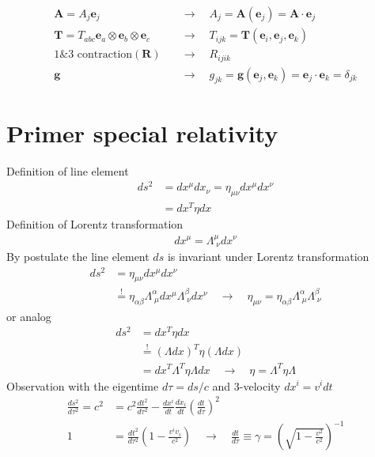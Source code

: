 \documentclass[10pt,a4paper]{article}
\theoremstyle{definition}
\begin{document}
\begin{itemize}
\begin{align}
    \mathbf{A}=A_j\mathbf{e}_j\quad&\rightarrow\quad A_j=\mathbf{A}(\mathbf{e}_j)=\mathbf{A}\cdot\mathbf{e}_j\\
    \mathbf{T}=T_{abc}\mathbf{e}_a\otimes\mathbf{e}_b\otimes\mathbf{e}_c\quad&\rightarrow\quad T_{ijk}=\mathbf{T}(\mathbf{e}_i,\mathbf{e}_j,\mathbf{e}_k)\\
    \text{1\&3 contraction}(\mathbf{R})\quad&\rightarrow\quad R_{ijik}\\
    \mathbf{g}\quad&\rightarrow\quad g_{jk}=\mathbf{g}(\mathbf{e}_j,\mathbf{e}_k)=\mathbf{e}_j\cdot\mathbf{e}_k=\delta_{jk}
\end{align}
\end{itemize}


\newpage
\section{Primer special relativity}
Definition of line element
\begin{align}
    ds^2 &= dx^\mu dx_\nu = \eta_{\mu\nu}dx^\mu dx^\nu\\
        &= dx^T\eta dx
\end{align}
Definition of Lorentz transformation
\begin{align}
    dx^\mu = \Lambda^\mu_{\;\nu}dx^\nu
\end{align}
By postulate the line element $ds$ is invariant under Lorentz transformation
\begin{align}
    ds^2 &= \eta_{\mu\nu}dx^\mu dx^\nu\\
    &\stackrel{!}{=} \eta_{\alpha\beta}\Lambda^\alpha_{\;\mu}dx^\mu \Lambda^\beta_{\;\nu}dx^\nu\quad\rightarrow\quad \eta_{\mu\nu} = \eta_{\alpha\beta}\Lambda^\alpha_{\;\mu} \Lambda^\beta_{\;\nu}
\end{align}
or analog
\begin{align}
    ds^2 &= dx^T\eta dx\\
    &\stackrel{!}{=} (\Lambda dx)^T\eta (\Lambda dx)\\
    &= dx^T\Lambda^T\eta \Lambda dx\quad\rightarrow\quad \eta = \Lambda^T\eta\Lambda
\end{align}
Observation with the eigentime $d\tau=ds/c$ and 3-velocity $dx^i = v^i dt$
\begin{align}
    \frac{ds^2}{d\tau^2}=c^2&=c^2\frac{dt^2}{d\tau^2}-\frac{dx^i}{dt}\frac{dx_i}{dt}\left(\frac{dt}{d\tau}\right)^2\\
    1&=\frac{dt^2}{d\tau^2}\left(1-\frac{v^iv_i}{c^2}\right)\quad\rightarrow\quad\frac{dt}{d\tau}\equiv\gamma=\left(\sqrt{1-\frac{v^2}{c^2}}\right)^{-1}
\end{align}
\end{document}
